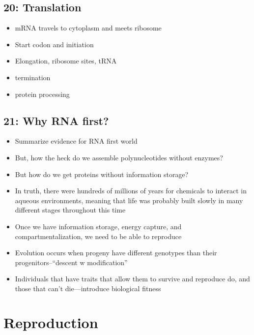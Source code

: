\documentclass[
]{report}
\providecommand{\tightlist}{%
  \setlength{\itemsep}{0pt}\setlength{\parskip}{0pt}}
\providecommand{\tightlist}{%
  \setlength{\itemsep}{0pt}\setlength{\parskip}{0pt}}
\begin{document}
\hypertarget{translation}{%
\section*{20: Translation}\label{translation}}

\begin{itemize}
\tightlist
\item
  mRNA travels to cytoplasm and meets ribosome
\item
  Start codon and initiation
\item
  Elongation, ribosome sites, tRNA
\item
  termination
\item
  protein processing
\end{itemize}

\hypertarget{why-rna-first}{%
\section*{21: Why RNA first?}\label{why-rna-first}}

\begin{itemize}
\tightlist
\item
  Summarize evidence for RNA first world
\item
  But, how the heck do we assemble polynucleotides without enzymes?
\item
  But how do we get proteins without information storage?
\item
  In truth, there were hundreds of millions of years for chemicals to interact in aqueous environments, meaning that life was probably built slowly in many different stages throughout this time
\item
  Once we have information storage, energy capture, and compartmentalization, we need to be able to reproduce
\item
  Evolution occurs when progeny have different genotypes than their progenitors--``descent w modification''
\item
  Individuals that have traits that allow them to survive and reproduce do, and those that can't die---introduce biological fitness
\end{itemize}

\hypertarget{reproduction}{%
\chapter{Reproduction}\label{reproduction}}
\end{document}
